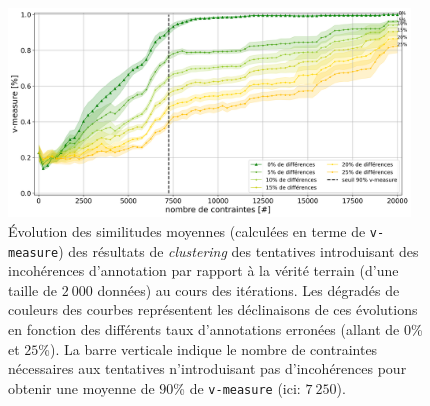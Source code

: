 			\begin{figure}[!htb]
				\centering
				\includegraphics[width=0.95\textwidth]{figures/etude-erreur-simulation-impact-size-2000}
				\caption{
					Évolution des similitudes moyennes (calculées en terme de \texttt{v-measure}) des résultats de \textit{clustering} des tentatives introduisant des incohérences d'annotation par rapport à la vérité terrain (d'une taille de $2~000$ données) au cours des itérations.
					Les dégradés de couleurs des courbes représentent les déclinaisons de ces évolutions en fonction des différents taux d'annotations erronées (allant de $0$\% et $25$\%).
					La barre verticale indique le nombre de contraintes nécessaires aux tentatives n'introduisant pas d'incohérences pour obtenir une moyenne de $90$\% de \texttt{v-measure} (ici: $7~250$).
				}
				\label{figure:4.6.2-ETUDE-ROBUSTESSE-SIMULATION-IMPACT-DIFFERENCES-2000}
			\end{figure}
			
